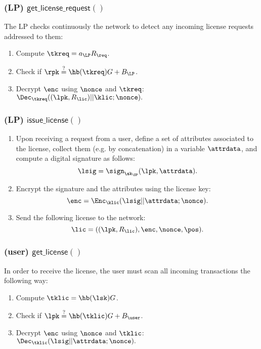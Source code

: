 \subsubsection{(\textbf{LP}) $\mathsf{get\_license\_request()}$}

The LP checks continuously the network to detect any incoming license requests addressed to them:

\begin{enumerate}
	\item Compute $\tkreq = a_{\LP}R_{\req}$.
	\item Check if $\rpk \stackrel{?}{=} \hb(\tkreq) G + B_{\LP}$.
	\item Decrypt $\enc$ using $\nonce$ and $\tkreq$: $\Dec_{\tkreq} ((\lpk, R_{\lic})||\klic; \nonce).$
\end{enumerate}

\subsubsection{(\textbf{LP}) $\mathsf{issue\_license()}$}

\begin{enumerate}
	\item Upon receiving a request from a user, define a set of attributes associated to the license, collect them (e.g. by concatenation) in a variable $\attrdata$, and compute a digital signature as follows:
	$$\lsig = \sign_{\sk_{\SP}}(\lpk, \attrdata).$$
	\item Encrypt the signature and the attributes using the license key:
	$$\enc = \Enc_{\klic} (\lsig || \attrdata; \nonce).$$
	\item Send the following license to the network:
	$$\lic = ((\lpk, R_{\lic}), \enc, \nonce, \pos).$$
\end{enumerate}

\subsubsection{(\textbf{user}) $\mathsf{get\_license()}$}

In order to receive the license, the user must scan all incoming transactions the following way:

\begin{enumerate}
	\item Compute $\tklic = \hb(\lsk)G$.
	\item Check if $\lpk \stackrel{?}{=} \hb(\tklic) G + B_{\user}$.
	\item Decrypt $\enc$ using $\nonce$ and $\tklic$: $\Dec_{\tklic}  (\lsig || \attrdata; \nonce).$
\end{enumerate}	

